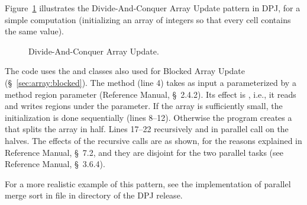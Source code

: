  Figure~\ref{fig:array:dandc}
illustrates the Divide-And-Conquer Array Update pattern in DPJ, for a
simple computation (initializing an array of integers so that every
cell contains the same value).  

\begin{figure}

\caption{Divide-And-Conquer Array Update.}
\label{fig:array:dandc}
\end{figure}

The code uses the  and  classes
also used for Blocked Array Update (\S~\ref{sec:array:blocked}).  The
method  (line 4) takes as input a 
parameterized by a method region parameter  (Reference Manual,
\S~2.4.2).  Its effect is , i.e., it reads and writes
regions under the parameter.  If the array is sufficiently small, the
initialization is done sequentially (lines 8--12).  Otherwise the
program creates a  that splits the array in half.
Lines 17--22 recursively and in parallel call  on
the halves.  The effects of the recursive calls are as shown, for the
reasons explained in Reference Manual, \S~7.2, and they are disjoint
for the two parallel tasks (see Reference Manual, \S~3.6.4).

 For a more realistic example of this
pattern, see the implementation of parallel merge sort in file
 in directory  of the
DPJ release.


